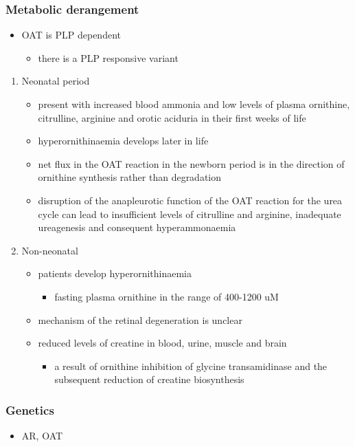 \documentclass{scrartcl}
\begin{document}
\subsubsection{Metabolic derangement}
\label{sec:org26788e9}
\begin{itemize}
\item OAT is PLP dependent
\begin{itemize}
\item there is a PLP responsive variant
\end{itemize}
\end{itemize}
\begin{enumerate}
\item Neonatal period
\label{sec:org23fd04e}
\begin{itemize}
\item present with increased blood ammonia and low levels of plasma
ornithine, citrulline, arginine and orotic aciduria in their first
weeks of life
\item hyperornithinaemia develops later in life
\item net flux in the OAT reaction in the newborn period is in the
direction of ornithine synthesis rather than degradation
\item disruption of the anapleurotic function of the OAT reaction for the
urea cycle can lead to insufficient levels of citrulline and
arginine, inadequate ureagenesis and consequent hyperammonaemia
\end{itemize}
\item Non-neonatal
\label{sec:org9076c10}
\begin{itemize}
\item patients develop hyperornithinaemia
\begin{itemize}
\item fasting plasma ornithine in the range of 400-1200 uM
\end{itemize}
\item mechanism of the retinal degeneration is unclear
\item reduced levels of creatine in blood, urine, muscle and brain
\begin{itemize}
\item a result of ornithine inhibition of glycine transamidinase and the
subsequent reduction of creatine biosynthesis
\end{itemize}
\end{itemize}
\end{enumerate}

\subsubsection{Genetics}
\label{sec:org61f4e59}
\begin{itemize}
\item AR, OAT
\end{itemize}
\end{document}
